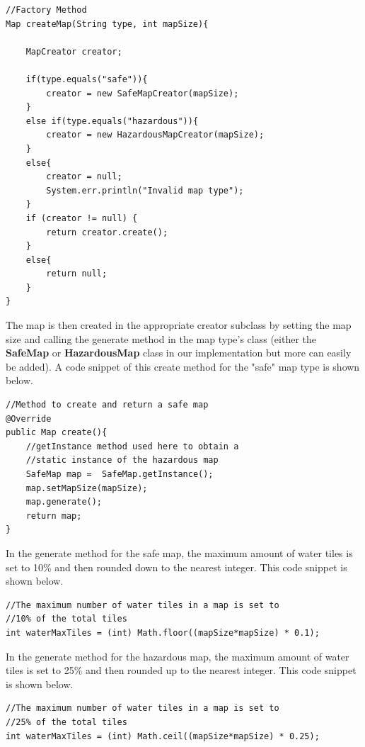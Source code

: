\documentclass[a4paper,12pt]{extarticle}
\begin{document}
\vspace{-1mm}
\begin{lstlisting}
//Factory Method
Map createMap(String type, int mapSize){

    MapCreator creator;

    if(type.equals("safe")){
        creator = new SafeMapCreator(mapSize);
    }
    else if(type.equals("hazardous")){
        creator = new HazardousMapCreator(mapSize);
    }
    else{
        creator = null;
        System.err.println("Invalid map type");
    }
    if (creator != null) {
        return creator.create();
    }
    else{
        return null;
    }
}
\end{lstlisting}
\vspace{4mm}

\noindent The map is then created in the appropriate creator subclass by setting the map size and calling the generate method in the map type's class (either the \textbf{SafeMap} or \textbf{HazardousMap} class in our implementation but more can easily be added). A code snippet of this create method for the "safe" map type is shown below.

\vspace{-1mm}
\begin{lstlisting}
//Method to create and return a safe map
@Override
public Map create(){
    //getInstance method used here to obtain a 
    //static instance of the hazardous map
    SafeMap map =  SafeMap.getInstance();
    map.setMapSize(mapSize);
    map.generate();
    return map;
}
\end{lstlisting}

\noindent In the generate method for the safe map, the maximum amount of water tiles is set to 10\% and then rounded down to the nearest integer. This code snippet is shown below.

\begin{lstlisting}
//The maximum number of water tiles in a map is set to
//10% of the total tiles
int waterMaxTiles = (int) Math.floor((mapSize*mapSize) * 0.1);
\end{lstlisting}
\vspace{4mm}

\noindent In the generate method for the hazardous map, the maximum amount of water tiles is set to 25\% and then rounded up to the nearest integer. This code snippet is shown below.

\begin{lstlisting}
//The maximum number of water tiles in a map is set to 
//25% of the total tiles
int waterMaxTiles = (int) Math.ceil((mapSize*mapSize) * 0.25);
\end{lstlisting}
\vspace{4mm}
\end{document}
